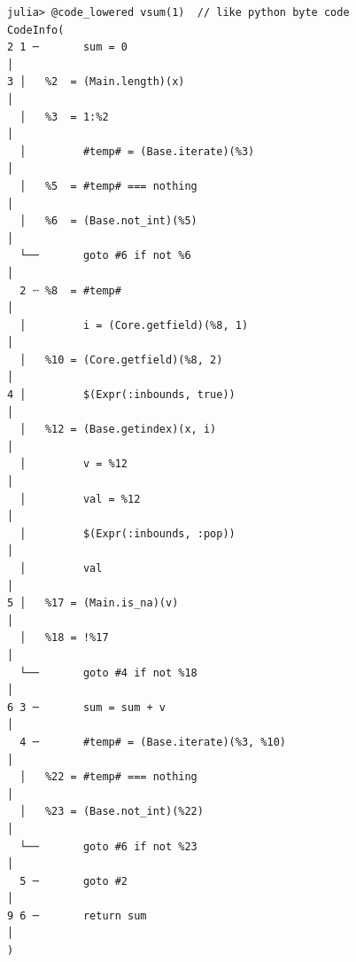 \begin{lstlisting}
julia> @code_lowered vsum(1)  // like python byte code
CodeInfo(
2 1 ─       sum = 0                                                         │
3 │   %2  = (Main.length)(x)                                                │
  │   %3  = 1:%2                                                            │
  │         #temp# = (Base.iterate)(%3)                                     │
  │   %5  = #temp# === nothing                                              │
  │   %6  = (Base.not_int)(%5)                                              │
  └──       goto #6 if not %6                                               │
  2 ┄ %8  = #temp#                                                          │
  │         i = (Core.getfield)(%8, 1)                                      │
  │   %10 = (Core.getfield)(%8, 2)                                          │
4 │         $(Expr(:inbounds, true))                                        │
  │   %12 = (Base.getindex)(x, i)                                           │
  │         v = %12                                                         │
  │         val = %12                                                       │
  │         $(Expr(:inbounds, :pop))                                        │
  │         val                                                             │
5 │   %17 = (Main.is_na)(v)                                                 │
  │   %18 = !%17                                                            │
  └──       goto #4 if not %18                                              │
6 3 ─       sum = sum + v                                                   │
  4 ─       #temp# = (Base.iterate)(%3, %10)                                │
  │   %22 = #temp# === nothing                                              │
  │   %23 = (Base.not_int)(%22)                                             │
  └──       goto #6 if not %23                                              │
  5 ─       goto #2                                                         │
9 6 ─       return sum                                                      │
)

\end{lstlisting}

